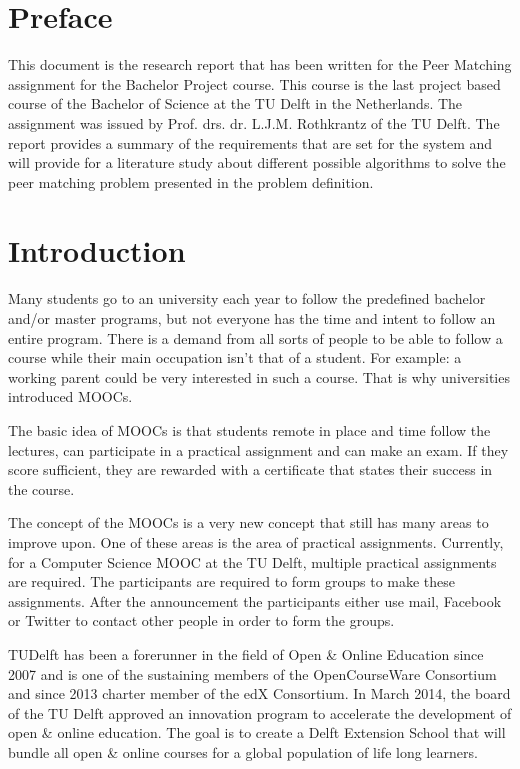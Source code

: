 \section*{Preface}
This document is the research report that has been written for the Peer Matching assignment for the Bachelor Project course.
This course is the last project based course of the Bachelor of Science at the TU Delft in the Netherlands. The assignment was issued by Prof. drs. dr. L.J.M. Rothkrantz of the TU Delft.
The report provides a summary of the requirements that are set for the system and will provide for a literature study about different possible algorithms to solve the peer matching problem presented in the problem definition.

\section*{Introduction}
Many students go to an university each year to follow the predefined bachelor and/or master programs, but not everyone has the time and intent to follow an entire program.
There is a demand from all sorts of people to be able to follow a course while their main occupation isn't that of a student.
For example: a working parent could be very interested in such a course.
That is why universities introduced MOOCs.

The basic idea of MOOCs is that students remote in place and time follow the lectures, can participate in a practical assignment and can make an exam.
If they score sufficient, they are rewarded with a certificate that states their success in the course.

The concept of the MOOCs is a very new concept that still has many areas to improve upon.
One of these areas is the area of practical assignments.
Currently, for a Computer Science MOOC at the TU Delft, multiple practical assignments are required.
The participants are required to form groups to make these assignments.
After the announcement the participants either use mail, Facebook or  Twitter to contact other people in order to form the groups.

TUDelft has been a forerunner in the field of Open \& Online Education since 2007 and is one of the sustaining members of the OpenCourseWare Consortium and since 2013 charter member of the edX Consortium. 
In March 2014, the board of the TU Delft approved an innovation program to accelerate the development of open \& online education. 
The goal is to create a Delft Extension School that will bundle all open \& online courses for a global population of life long learners.

